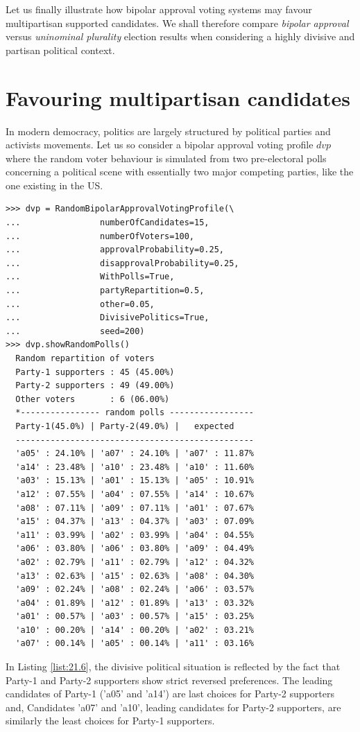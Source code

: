 Let us finally illustrate how bipolar approval voting systems may favour multipartisan supported candidates. We shall therefore compare \emph{bipolar approval} versus \emph{uninominal plurality} election results when considering a highly divisive and partisan political context.
 
\section{Favouring multipartisan candidates}
\label{sec:21.3}

In modern democracy, politics  are largely structured by political parties and activists movements. Let us so consider a bipolar approval voting profile $dvp$ where the random voter behaviour is simulated from two pre-electoral polls concerning a political scene with essentially two major competing parties, like the one existing in the US.
\begin{lstlisting}[caption={A random bipolar approval voting profile in a divisive political context},label=list:21.6]
>>> dvp = RandomBipolarApprovalVotingProfile(\
...                numberOfCandidates=15,
...                numberOfVoters=100,
...                approvalProbability=0.25,
...                disapprovalProbability=0.25,
...                WithPolls=True,
...                partyRepartition=0.5,
...                other=0.05,
...                DivisivePolitics=True,
...                seed=200)
>>> dvp.showRandomPolls()
  Random repartition of voters
  Party-1 supporters : 45 (45.00%)
  Party-2 supporters : 49 (49.00%)
  Other voters       : 6 (06.00%)
  *---------------- random polls -----------------
  Party-1(45.0%) | Party-2(49.0%) |   expected  
  ------------------------------------------------
  'a05' : 24.10% | 'a07' : 24.10% | 'a07' : 11.87%
  'a14' : 23.48% | 'a10' : 23.48% | 'a10' : 11.60%
  'a03' : 15.13% | 'a01' : 15.13% | 'a05' : 10.91%
  'a12' : 07.55% | 'a04' : 07.55% | 'a14' : 10.67%
  'a08' : 07.11% | 'a09' : 07.11% | 'a01' : 07.67%
  'a15' : 04.37% | 'a13' : 04.37% | 'a03' : 07.09%
  'a11' : 03.99% | 'a02' : 03.99% | 'a04' : 04.55%
  'a06' : 03.80% | 'a06' : 03.80% | 'a09' : 04.49%
  'a02' : 02.79% | 'a11' : 02.79% | 'a12' : 04.32%
  'a13' : 02.63% | 'a15' : 02.63% | 'a08' : 04.30%
  'a09' : 02.24% | 'a08' : 02.24% | 'a06' : 03.57%
  'a04' : 01.89% | 'a12' : 01.89% | 'a13' : 03.32%
  'a01' : 00.57% | 'a03' : 00.57% | 'a15' : 03.25%
  'a10' : 00.20% | 'a14' : 00.20% | 'a02' : 03.21%
  'a07' : 00.14% | 'a05' : 00.14% | 'a11' : 03.16%
\end{lstlisting}   
In Listing \ref{list:21.6}, the divisive political situation is reflected by the fact that Party-1 and Party-2 supporters show strict reversed preferences. The leading candidates of Party-1 ('a05' and 'a14') are last choices for Party-2 supporters and, Candidates 'a07' and 'a10', leading candidates for Party-2 supporters, are similarly the least choices for Party-1 supporters.

